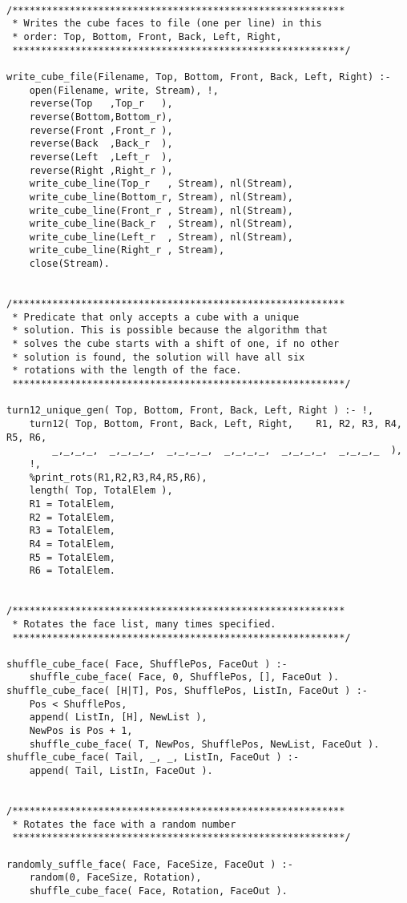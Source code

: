 \begin{lstlisting}
	
/**********************************************************
 * Writes the cube faces to file (one per line) in this
 * order: Top, Bottom, Front, Back, Left, Right, 
 **********************************************************/
 
write_cube_file(Filename, Top, Bottom, Front, Back, Left, Right) :-
	open(Filename, write, Stream), !,
	reverse(Top   ,Top_r   ),
	reverse(Bottom,Bottom_r),
	reverse(Front ,Front_r ),
	reverse(Back  ,Back_r  ),
	reverse(Left  ,Left_r  ),
	reverse(Right ,Right_r ),
	write_cube_line(Top_r   , Stream), nl(Stream),
	write_cube_line(Bottom_r, Stream), nl(Stream),
	write_cube_line(Front_r , Stream), nl(Stream),
	write_cube_line(Back_r  , Stream), nl(Stream),
	write_cube_line(Left_r  , Stream), nl(Stream),
	write_cube_line(Right_r , Stream),
	close(Stream).
	
	
/**********************************************************
 * Predicate that only accepts a cube with a unique
 * solution. This is possible because the algorithm that
 * solves the cube starts with a shift of one, if no other
 * solution is found, the solution will have all six
 * rotations with the length of the face.
 **********************************************************/
 
turn12_unique_gen( Top, Bottom, Front, Back, Left, Right ) :- !,
	turn12( Top, Bottom, Front, Back, Left, Right,    R1, R2, R3, R4, R5, R6,
		_,_,_,_,  _,_,_,_,  _,_,_,_,  _,_,_,_,  _,_,_,_,  _,_,_,_  ),
	!,	
	%print_rots(R1,R2,R3,R4,R5,R6),
	length( Top, TotalElem ),	
	R1 = TotalElem,
	R2 = TotalElem,
	R3 = TotalElem,
	R4 = TotalElem,
	R5 = TotalElem,
	R6 = TotalElem.


/**********************************************************
 * Rotates the face list, many times specified.
 **********************************************************/
 
shuffle_cube_face( Face, ShufflePos, FaceOut ) :-
	shuffle_cube_face( Face, 0, ShufflePos, [], FaceOut ).
shuffle_cube_face( [H|T], Pos, ShufflePos, ListIn, FaceOut ) :-
	Pos < ShufflePos,
	append( ListIn, [H], NewList ),
	NewPos is Pos + 1,
	shuffle_cube_face( T, NewPos, ShufflePos, NewList, FaceOut ).
shuffle_cube_face( Tail, _, _, ListIn, FaceOut ) :-
	append( Tail, ListIn, FaceOut ).
	
	
/**********************************************************
 * Rotates the face with a random number
 **********************************************************/
 
randomly_suffle_face( Face, FaceSize, FaceOut ) :-
	random(0, FaceSize, Rotation),
	shuffle_cube_face( Face, Rotation, FaceOut ).
	

\end{lstlisting}
